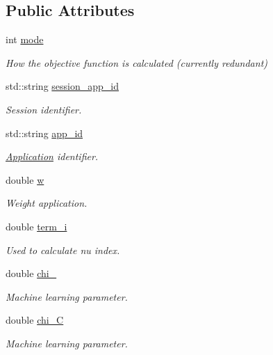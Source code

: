 \subsection*{Public Attributes}
\begin{DoxyCompactItemize}
\item 
int \hyperlink{classApplication_abc7e87e8cbe2e64fa4e2ff2afdf7a4fc}{mode}
\begin{DoxyCompactList}\small\item\em How the objective function is calculated (currently redundant) \end{DoxyCompactList}\item 
std\-::string \hyperlink{classApplication_a5e28ffadb86925ecae57ab18c0085d90}{session\-\_\-app\-\_\-id}
\begin{DoxyCompactList}\small\item\em Session identifier. \end{DoxyCompactList}\item 
std\-::string \hyperlink{classApplication_a05377e6cdcb9d48f29e0f1972a4a16fe}{app\-\_\-id}
\begin{DoxyCompactList}\small\item\em \hyperlink{classApplication}{Application} identifier. \end{DoxyCompactList}\item 
double \hyperlink{classApplication_aead1b7b0150c2a3ebd6c36b1db8c4732}{w}
\begin{DoxyCompactList}\small\item\em Weight application. \end{DoxyCompactList}\item 
double \hyperlink{classApplication_ad5486702327ad61e56ed04fb54d58c20}{term\-\_\-i}
\begin{DoxyCompactList}\small\item\em Used to calculate nu index. \end{DoxyCompactList}\item 
double \hyperlink{classApplication_a3b9dab40d189989c836b8d328946bbb6}{chi\-\_}
\begin{DoxyCompactList}\small\item\em Machine learning parameter. \end{DoxyCompactList}\item 
double \hyperlink{classApplication_a46e29a6bfc74de610feec809a77dfb62}{chi\-\_\-\-C}
\begin{DoxyCompactList}\small\item\em Machine learning parameter. \end{DoxyCompactList}\item 

\end{DoxyCompactItemize}

